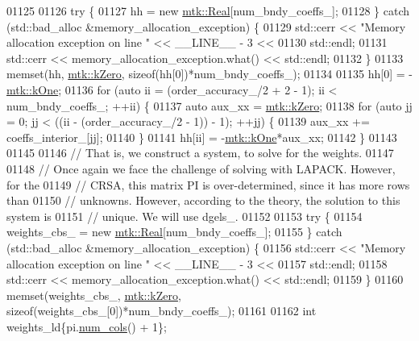 \begin{DoxyCode}
{{01125 
01126   \textcolor{keywordflow}{try} \{
01127     hh = \textcolor{keyword}{new} \hyperlink{group__c01-roots_gac080bbbf5cbb5502c9f00405f894857d}{mtk::Real}[num\_bndy\_coeffs\_];
01128   \} \textcolor{keywordflow}{catch} (std::bad\_alloc &memory\_allocation\_exception) \{
01129     std::cerr << \textcolor{stringliteral}{"Memory allocation exception on line "} << \_\_LINE\_\_ - 3 <<
01130       std::endl;
01131     std::cerr << memory\_allocation\_exception.what() << std::endl;
01132   \}
01133   memset(hh, \hyperlink{group__c01-roots_ga59a451a5fae30d59649bcda274fea271}{mtk::kZero}, \textcolor{keyword}{sizeof}(hh[0])*num\_bndy\_coeffs\_);
01134 
01135   hh[0] = -\hyperlink{group__c01-roots_ga26407c24d43b6b95480943340d285c71}{mtk::kOne};
01136   \textcolor{keywordflow}{for} (\textcolor{keyword}{auto} ii = (order\_accuracy\_/2 + 2 - 1); ii < num\_bndy\_coeffs\_; ++ii) \{
01137     \textcolor{keyword}{auto} aux\_xx = \hyperlink{group__c01-roots_ga59a451a5fae30d59649bcda274fea271}{mtk::kZero};
01138     \textcolor{keywordflow}{for} (\textcolor{keyword}{auto} jj = 0; jj < ((ii - (order\_accuracy\_/2 - 1)) - 1); ++jj) \{
01139       aux\_xx += coeffs\_interior\_[jj];
01140     \}
01141     hh[ii] = -\hyperlink{group__c01-roots_ga26407c24d43b6b95480943340d285c71}{mtk::kOne}*aux\_xx;
01142   \}
01143 
01145 
01146   \textcolor{comment}{// That is, we construct a system, to solve for the weights.}
01147 
01148   \textcolor{comment}{// Once again we face the challenge of solving with LAPACK. However, for the}
01149   \textcolor{comment}{// CRSA, this matrix PI is over-determined, since it has more rows than}
01150   \textcolor{comment}{// unknowns. However, according to the theory, the solution to this system is}
01151   \textcolor{comment}{// unique. We will use dgels\_.}
01152 
01153   \textcolor{keywordflow}{try} \{
01154     weights\_cbs\_ = \textcolor{keyword}{new} \hyperlink{group__c01-roots_gac080bbbf5cbb5502c9f00405f894857d}{mtk::Real}[num\_bndy\_coeffs\_];
01155   \} \textcolor{keywordflow}{catch} (std::bad\_alloc &memory\_allocation\_exception) \{
01156     std::cerr << \textcolor{stringliteral}{"Memory allocation exception on line "} << \_\_LINE\_\_ - 3 <<
01157       std::endl;
01158     std::cerr << memory\_allocation\_exception.what() << std::endl;
01159   \}
01160   memset(weights\_cbs\_, \hyperlink{group__c01-roots_ga59a451a5fae30d59649bcda274fea271}{mtk::kZero}, \textcolor{keyword}{sizeof}(weights\_cbs\_[0])*num\_bndy\_coeffs\_);
01161 
01162   \textcolor{keywordtype}{int} weights\_ld\{pi.\hyperlink{classmtk_1_1DenseMatrix_af6f78373aaf2136f0c78974d7c8de0a8}{num\_cols}() + 1\};
}}
\end{DoxyCode}
